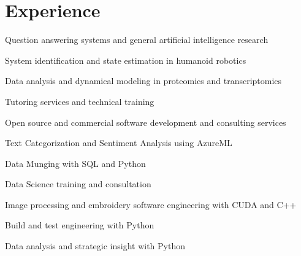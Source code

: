 \documentclass[letterpaper]{deedy-resume} %
\begin{document}
\begin{minipage}[t]{0.66\textwidth} %


\section{Experience}

\vspace{\topsep}
\begin{tightitemize}
\item Question answering systems and general artificial intelligence research
\item System identification and state estimation in humanoid robotics
\item Data analysis and dynamical modeling in proteomics and transcriptomics
\item Tutoring services and technical training
\item Open source and commercial software development and consulting services
\end{tightitemize}

\sectionspace

\begin{tightitemize}
\item Text Categorization and Sentiment Analysis using AzureML
\item Data Munging with SQL and Python
\item Data Science training and consultation
\end{tightitemize}

\sectionspace


\begin{tightitemize}
\item Image processing and embroidery software engineering with CUDA and C++
\item Build and test engineering with Python
\item Data analysis and strategic insight with Python


\end{tightitemize}
\end{minipage}
\end{document}
